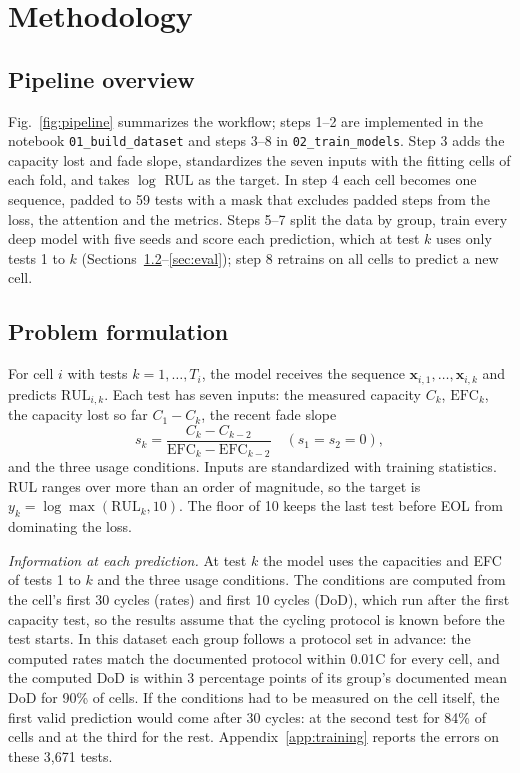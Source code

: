 \documentclass[conference]{IEEEtran}
\begin{document}
\section{Methodology}
\subsection{Pipeline overview}
Fig.~\ref{fig:pipeline} summarizes the workflow; steps 1--2 are implemented in the notebook \texttt{01\_build\_dataset} and steps 3--8 in \texttt{02\_train\_models}. Step 3 adds the capacity lost and fade slope, standardizes the seven inputs with the fitting cells of each fold, and takes $\log$ RUL as the target. In step 4 each cell becomes one sequence, padded to 59 tests with a mask that excludes padded steps from the loss, the attention and the metrics. Steps 5--7 split the data by group, train every deep model with five seeds and score each prediction, which at test $k$ uses only tests 1 to $k$ (Sections~\ref{sec:formulation}--\ref{sec:eval}); step 8 retrains on all cells to predict a new cell.

\subsection{Problem formulation}
\label{sec:formulation}
For cell $i$ with tests $k = 1, \dots, T_i$, the model receives the sequence $\mathbf{x}_{i,1}, \dots, \mathbf{x}_{i,k}$ and predicts $\mathrm{RUL}_{i,k}$. Each test has seven inputs: the measured capacity $C_k$, $\mathrm{EFC}_k$, the capacity lost so far $C_1 - C_k$, the recent fade slope
\begin{equation}
s_k = \frac{C_k - C_{k-2}}{\mathrm{EFC}_k - \mathrm{EFC}_{k-2}} \quad (s_1 = s_2 = 0),
\end{equation}
and the three usage conditions. Inputs are standardized with training statistics. RUL ranges over more than an order of magnitude, so the target is $y_k = \log \max(\mathrm{RUL}_k, 10)$. The floor of 10 keeps the last test before EOL from dominating the loss.

\emph{Information at each prediction.} At test $k$ the model uses the capacities and EFC of tests 1 to $k$ and the three usage conditions. The conditions are computed from the cell's first 30 cycles (rates) and first 10 cycles (DoD), which run after the first capacity test, so the results assume that the cycling protocol is known before the test starts. In this dataset each group follows a protocol set in advance: the computed rates match the documented protocol \cite{thelen2023} within 0.01C for every cell, and the computed DoD is within 3 percentage points of its group's documented mean DoD for 90\% of cells. If the conditions had to be measured on the cell itself, the first valid prediction would come after 30 cycles: at the second test for 84\% of cells and at the third for the rest. Appendix~\ref{app:training} reports the errors on these 3,671 tests.
\end{document}
